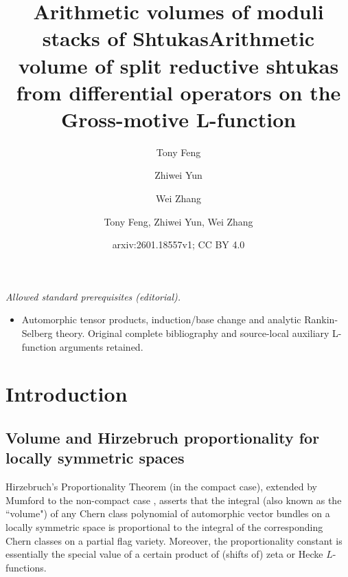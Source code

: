 \documentclass[reqno]{amsart}
\title[Arithmetic volumes of moduli stacks of Shtukas]{Arithmetic volumes of moduli stacks of Shtukas}
\author{Tony Feng}
\author{Zhiwei Yun}
\author{Wei Zhang}
\date{}
\title{Arithmetic volume of split reductive shtukas from differential operators on the Gross-motive L-function}
\author{Tony Feng, Zhiwei Yun, Wei Zhang}
\date{arxiv:2601.18557v1; CC BY 4.0}
\numberwithin{equation}{subsection}
\theoremstyle{definition}
\begin{document}
\maketitle
\noindent\textit{Allowed standard prerequisites (editorial).}\begin{itemize}
\item Automorphic tensor products, induction/base change and analytic Rankin-Selberg theory. Original complete bibliography and source-local auxiliary L-function arguments retained.
\end{itemize}\medskip
\section{Introduction}


\subsection{Volume and Hirzebruch proportionality for locally symmetric spaces}
Hirzebruch's Proportionality Theorem \cite{Hir} (in the compact case), extended by Mumford to the non-compact case \cite{Mum}, asserts that the integral (also known as the ``volume") of any Chern class polynomial of automorphic vector bundles on a locally symmetric space is proportional to the integral of the corresponding Chern classes on a partial flag variety. Moreover, the proportionality constant is essentially the special value of a certain product of (shifts of) zeta or Hecke $L$-functions. 
\end{document}
